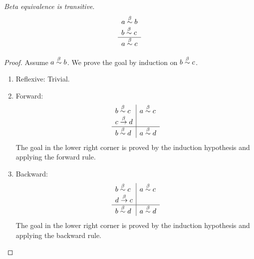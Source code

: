 \begin{theorem}
    \label{BetaEquivalenceTransitive}
    \emph{Beta equivalence is transitive}.
    $$
    \begin{array}{l} a \stackrel{\beta}{\sim} b \\ b \stackrel{\beta}{\sim} c \\ \hline a \stackrel{\beta}{\sim} c\end{array}
    $$
    \begin{proof}
        Assume $a \stackrel{\beta}{\sim} b$. We prove the goal by induction on $b \stackrel{\beta}{\sim}
        c$.
        \begin{enumerate}
        \item Reflexive: Trivial.

        \item Forward:
            $$
            \begin{array}{l|l}
                b \stackrel{\beta}{\sim} c
                &
                a \stackrel{\beta}{\sim} c
                \\
                c \stackrel{\beta}{\to} d
                \\
                \hline
                b \stackrel{\beta}{\sim} d
                &
                a \stackrel{\beta}{\sim} d
            \end{array}
            $$
            The goal in the lower right corner is proved by the induction
                hypothesis and applying the forward rule.

        \item Backward:
            $$
            \begin{array}{l|l}
                b \stackrel{\beta}{\sim} c
                &
                a \stackrel{\beta}{\sim} c
                \\
                d \stackrel{\beta}{\to} c
                \\
                \hline
                b \stackrel{\beta}{\sim} d
                &
                a \stackrel{\beta}{\sim} d
            \end{array}
            $$
            The goal in the lower right corner is proved by the induction
                hypothesis and applying the backward rule.
        \end{enumerate}
    \end{proof}
\end{theorem}



